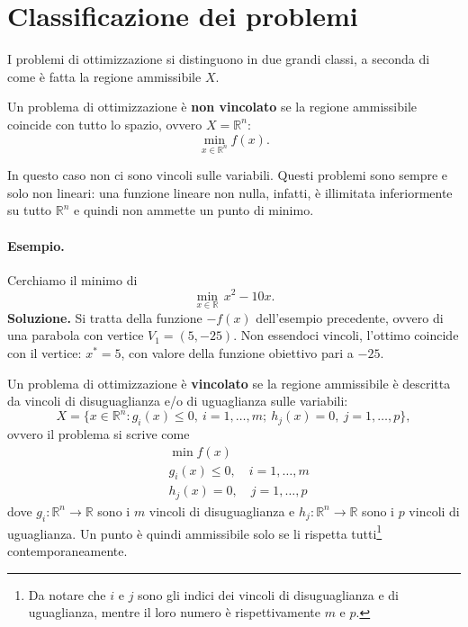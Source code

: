 \section{Classificazione dei problemi}
I problemi di ottimizzazione si distinguono in due grandi classi, a seconda di come è fatta la regione ammissibile $X$.

\begin{definizione}
Un problema di ottimizzazione è \textbf{non vincolato} se la regione ammissibile coincide con tutto lo spazio, ovvero $X = \mathbb{R}^n$:
\[
\min_{x \in \mathbb{R}^n} f(x).
\]
\end{definizione}

In questo caso non ci sono vincoli sulle variabili. Questi problemi sono sempre e solo non lineari: una funzione lineare non nulla, infatti, è illimitata inferiormente su tutto $\mathbb{R}^n$ e quindi non ammette un punto di minimo.

\paragraph{Esempio.}
Cerchiamo il minimo di
\[
\min_{x \in \mathbb{R}} \, x^2 - 10x.
\]
\textbf{Soluzione.} Si tratta della funzione $-f(x)$ dell'esempio precedente, ovvero di una parabola con vertice $V_1 = (5, -25)$. Non essendoci vincoli, l'ottimo coincide con il vertice: $x^* = 5$, con valore della funzione obiettivo pari a $-25$.

\begin{definizione}
Un problema di ottimizzazione è \textbf{vincolato} se la regione ammissibile è descritta da vincoli di disuguaglianza e/o di uguaglianza sulle variabili:
\[
X = \{x \in \mathbb{R}^n : g_i(x) \le 0,\ i = 1, \dots, m;\ h_j(x) = 0,\ j = 1, \dots, p\},
\]
ovvero il problema si scrive come
\[
\begin{aligned}
&\min f(x) \\
&g_i(x) \le 0, \quad i = 1, \dots, m \\
&h_j(x) = 0, \quad j = 1, \dots, p
\end{aligned}
\]
dove $g_i : \mathbb{R}^n \to \mathbb{R}$ sono i $m$ vincoli di disuguaglianza e $h_j : \mathbb{R}^n \to \mathbb{R}$ sono i $p$ vincoli di uguaglianza. Un punto è quindi ammissibile solo se li rispetta tutti\footnote{Da notare che $i$ e $j$ sono gli indici dei vincoli di disuguaglianza e di uguaglianza, mentre il loro numero è rispettivamente $m$ e $p$.} contemporaneamente.
\end{definizione}

